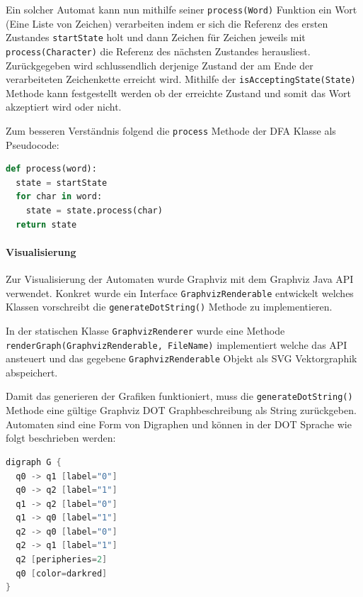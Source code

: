 Ein solcher Automat kann nun mithilfe seiner \lstinline$process(Word)$ Funktion ein Wort (Eine Liste von Zeichen) verarbeiten indem er sich die Referenz des ersten Zustandes \lstinline$startState$ holt und dann Zeichen für Zeichen jeweils mit \lstinline$process(Character)$ die Referenz des nächsten Zustandes herausliest. Zurückgegeben wird schlussendlich derjenige Zustand der am Ende der verarbeiteten Zeichenkette erreicht wird. Mithilfe der \lstinline$isAcceptingState(State)$ Methode kann festgestellt werden ob der erreichte Zustand und somit das Wort akzeptiert wird oder nicht. 

Zum besseren Verständnis folgend die \lstinline$process$ Methode der DFA Klasse als Pseudocode:

\begin{lstlisting}[language=Python, caption={Process Methode der DFA Klasse}]
def process(word):
  state = startState
  for char in word:
    state = state.process(char)
  return state
\end{lstlisting}

\paragraph{Visualisierung}
Zur Visualisierung der Automaten wurde Graphviz \cite{graphviz} mit dem Graphviz Java API \cite{graphvizjava} verwendet. Konkret wurde ein Interface \lstinline$GraphvizRenderable$ entwickelt welches Klassen vorschreibt die \lstinline$generateDotString()$ Methode zu implementieren.

In der statischen Klasse \lstinline$GraphvizRenderer$ wurde eine Methode \lstinline$renderGraph(GraphvizRenderable, FileName)$ implementiert welche das API ansteuert und das gegebene \lstinline$GraphvizRenderable$ Objekt als SVG Vektorgraphik abspeichert.

Damit das generieren der Grafiken funktioniert, muss die \lstinline$generateDotString()$ Methode eine gültige Graphviz DOT Graphbeschreibung als String zurückgeben. Automaten sind eine Form von Digraphen und können in der DOT Sprache wie folgt beschrieben werden:

\begin{lstlisting}[language=Java, caption={Automat in DOT Sprache}, label={lst:dot_language}]
digraph G {
  q0 -> q1 [label="0"]
  q0 -> q2 [label="1"]
  q1 -> q2 [label="0"]
  q1 -> q0 [label="1"]
  q2 -> q0 [label="0"]
  q2 -> q1 [label="1"]
  q2 [peripheries=2]
  q0 [color=darkred]
}
\end{lstlisting}

